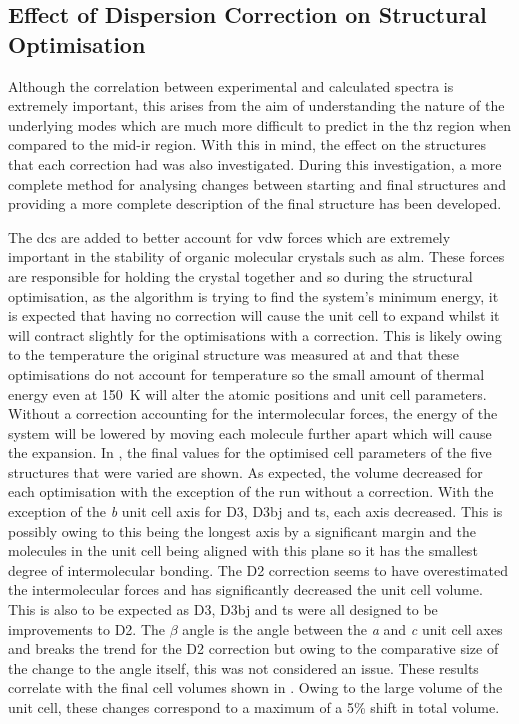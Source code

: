 \subsection{Effect of Dispersion Correction on Structural Optimisation}
Although the correlation between experimental and calculated spectra is extremely important, this arises from the aim of understanding the nature of the underlying modes which are much more difficult to predict in the \acrshort{thz} region when compared to the mid\nobreakdash-\acrshort{ir} region. With this in mind, the effect on the structures that each correction had was also investigated. During this investigation, a more complete method for analysing changes between starting and final structures and providing a more complete description of the final structure has been developed.

The \acrshort{dc}s are added to better account for \acrfull{vdw} forces which are extremely important in the stability of organic molecular crystals such as \acrshort{alm}. These forces are responsible for holding the crystal together and so during the structural optimisation, as the algorithm is trying to find the system's minimum energy, it is expected that having no correction will cause the unit cell to expand whilst it will contract slightly for the optimisations with a correction. This is likely owing to the temperature the original structure was measured at and that these optimisations do not account for temperature so the small amount of thermal energy even at \SI{150}{K} will alter the atomic positions and unit cell parameters. Without a correction accounting for the intermolecular forces, the energy of the system will be lowered by moving each molecule further apart which will cause the expansion. In , the final values for the optimised cell parameters of the five structures that were varied are shown. As expected, the volume decreased for each optimisation with the exception of the run without a correction. With the exception of the \textit{b} unit cell axis for D3, D3\acrshort{bj} and \acrshort{ts}, each axis decreased. This is possibly owing to this being the longest axis by a significant margin and the molecules in the unit cell being aligned with this plane so it has the smallest degree of intermolecular bonding. The D2 correction seems to have overestimated the intermolecular forces and has significantly decreased the unit cell volume. This is also to be expected as D3, D3\acrshort{bj} and \acrshort{ts} were all designed to be improvements to D2. The \(\beta\) angle is the angle between the \textit{a} and \textit{c} unit cell axes and breaks the trend for the D2 correction but owing to the comparative size of the change to the angle itself, this was not considered an issue. These results correlate with the final cell volumes shown in . Owing to the large volume of the unit cell, these changes correspond to a maximum of a 5\% shift in total volume.

